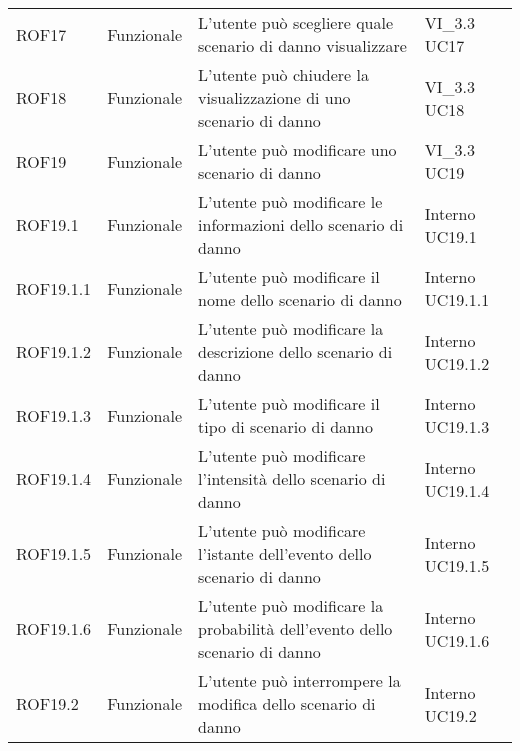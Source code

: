 \begin{longtable}{p{2cm}!{\VRule[1pt]}p{2cm}!{\VRule[1pt]}p{5cm}!{\VRule[1pt]}p{1.5cm}}
 \\
ROF17&Funzionale\newline  & L'utente può scegliere quale scenario di danno visualizzare & VI_3.3 \newline UC17
 \\
ROF18&Funzionale\newline  & L'utente può chiudere la visualizzazione di uno scenario di danno & VI_3.3 \newline UC18
 \\
ROF19&Funzionale\newline  & L'utente può modificare uno scenario di danno & VI_3.3 \newline UC19
 \\
ROF19.1&Funzionale\newline  & L'utente può modificare le informazioni dello scenario di danno & Interno \newline UC19.1
 \\
ROF19.1.1&Funzionale\newline  & L'utente può modificare il nome dello scenario di danno & Interno \newline UC19.1.1
 \\
ROF19.1.2&Funzionale\newline  & L'utente può modificare la descrizione dello scenario di danno & Interno \newline UC19.1.2
 \\
ROF19.1.3&Funzionale\newline  & L'utente può modificare il tipo di scenario di danno & Interno \newline UC19.1.3
 \\
ROF19.1.4&Funzionale\newline  & L'utente può modificare l'intensità dello scenario di danno & Interno \newline UC19.1.4
 \\
ROF19.1.5&Funzionale\newline  & L'utente può modificare l'istante dell'evento dello scenario di danno & Interno \newline UC19.1.5
 \\
ROF19.1.6&Funzionale\newline  & L'utente può modificare la probabilità dell'evento dello scenario di danno & Interno \newline UC19.1.6
 \\
ROF19.2&Funzionale\newline  & L'utente può interrompere la modifica dello scenario di danno & Interno \newline UC19.2

\end{longtable}
